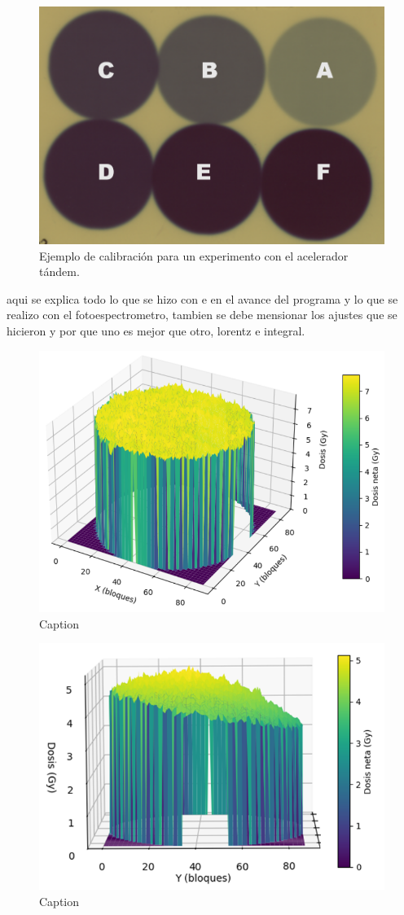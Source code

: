\documentclass[onecolumn,12pt]{article} %
\begin{document}
\begin{figure}[H]
    \centering
    \includegraphics[width=0.7\linewidth]{img_exp/RC_letrada.png}
    \caption{Ejemplo de calibración para un experimento con el acelerador tándem.}
    \label{fig:RCletrada}
\end{figure}



aqui se explica todo lo que se hizo con e en el avance del programa y lo que se realizo con el fotoespectrometro, tambien se debe mensionar los ajustes que se hicieron y por que uno es mejor que otro, lorentz e integral.




















\begin{figure}[H]
    \centering
    \includegraphics[width=0.5\linewidth]{img_exp/3DConvencional.png}
    \caption{Caption}
    \label{fig:enter-label}
\end{figure}

\begin{figure}[H]
    \centering
    \includegraphics[width=0.5\linewidth]{img_exp/3Dflash.png}
    \caption{Caption}
    \label{fig:enter-label}
\end{figure}
\end{document}

